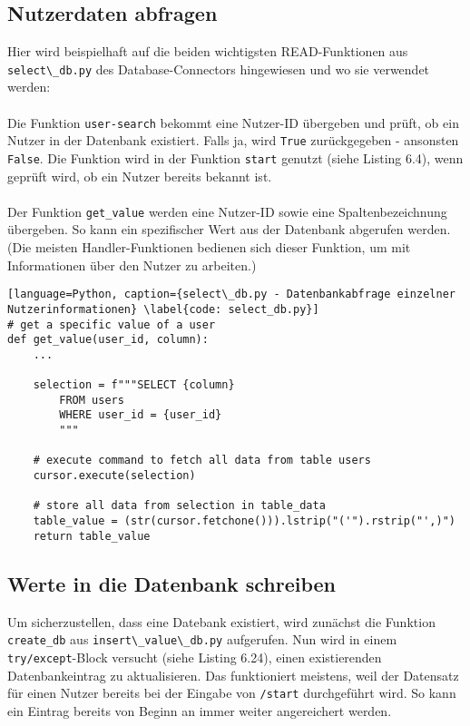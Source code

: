        \subsection{Nutzerdaten abfragen} \label{Implementierung: select_db.py}
            Hier wird beispielhaft auf die beiden wichtigsten READ-Funktionen aus \verb|select\_db.py| des Database-Connectors hingewiesen und wo sie verwendet werden: \\
            \\
            Die Funktion \verb|user-search| bekommt eine Nutzer-ID übergeben und prüft, ob ein Nutzer in der Datenbank existiert. Falls ja, wird \verb|True| zurückgegeben - ansonsten \verb|False|. Die Funktion wird in der Funktion \verb|start| genutzt (siehe Listing 6.4), wenn geprüft wird, ob ein Nutzer bereits bekannt ist.\\ 
            \\
            Der Funktion \verb|get_value| werden eine Nutzer-ID sowie eine Spaltenbezeichnung übergeben. So kann ein spezifischer Wert aus der Datenbank abgerufen werden. (Die meisten Handler-Funktionen bedienen sich dieser Funktion, um mit Informationen über den Nutzer zu arbeiten.) 
                \begin{lstlisting}[language=Python, caption={select\_db.py - Datenbankabfrage einzelner Nutzerinformationen} \label{code: select_db.py}]
# get a specific value of a user
def get_value(user_id, column):
    ...

    selection = f"""SELECT {column}
        FROM users
        WHERE user_id = {user_id}
        """

    # execute command to fetch all data from table users
    cursor.execute(selection)

    # store all data from selection in table_data
    table_value = (str(cursor.fetchone())).lstrip("('").rstrip("',)")
    return table_value
                \end{lstlisting}

        \subsection{Werte in die Datenbank schreiben} \label{Implementierung: insert_value_db.py}
            Um sicherzustellen, dass eine Datebank existiert, wird zunächst die Funktion \verb|create_db| aus \verb|insert\_value\_db.py| aufgerufen. Nun wird in einem \verb|try/except|-Block versucht (siehe Listing 6.24), einen existierenden Datenbankeintrag zu aktualisieren. Das funktioniert meistens, weil der Datensatz für einen Nutzer bereits bei der Eingabe von \verb|/start| durchgeführt wird. So kann ein Eintrag bereits von Beginn an immer weiter angereichert werden.

